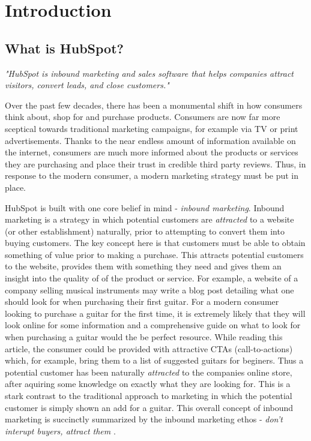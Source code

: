 \chapter{Introduction}

\section{What is HubSpot?}
\textit{"HubSpot is inbound marketing and sales software that helps companies attract visitors, convert leads, and close customers."} \cite{whatIsHubSpot}\hfill\break

Over the past few decades, there has been a monumental shift in how consumers think about, shop for and purchase products. Consumers are now far more sceptical towards traditional marketing campaigns, for example via TV or print advertisements. Thanks to the near endless amount of information available on the internet, consumers are much more informed about the products or services they are purchasing and place their trust in credible third party reviews. Thus, in response to the modern consumer, a modern marketing strategy must be put in place. 

HubSpot is built with one core belief in mind - \textit{inbound marketing}. Inbound marketing is a strategy in which potential customers are \textit{attracted} to a website (or other establishment) naturally, prior to attempting to convert them into buying customers. The key concept here is that customers must be able to obtain something of value prior to making a purchase. This attracts potential customers to the website, provides them with something they need and gives them an insight into the quality of of the product or service. For example, a website of a company selling musical instruments may write a blog post detailing what one should look for when purchasing their first guitar. For a modern consumer looking to purchase a guitar for the first time, it is extremely likely that they will look online for some information and a comprehensive guide on what to look for when purchasing a guitar would the be perfect resource. While reading this article, the consumer could be provided with attractive CTAs (call-to-actions) which, for example, bring them to a list of suggested guitars for beginers. Thus a potential customer has been naturally \textit{attracted} to the companies online store, after aquiring some knowledge on exactly what they are looking for. This is a stark contrast to the traditional approach to marketing in which the potential customer is simply shown an add for a guitar. This overall concept of inbound marketing is succinctly summarized by the inbound marketing ethos - \textit{don't interupt buyers, attract them} \cite{whatIsHubSpot}.

